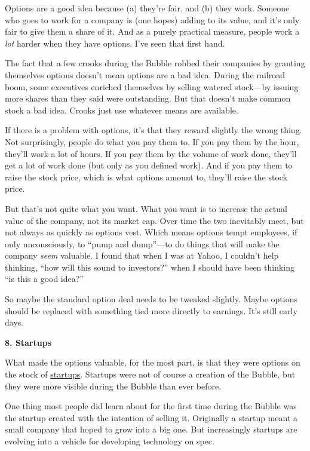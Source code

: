 Options are a good idea because (a) they're fair, and (b) they work.
Someone who goes to work for a company is (one hopes) adding to its
value, and it's only fair to give them a share of it. And as a purely
practical measure, people work a \emph{lot} harder when they have
options. I've seen that first hand.

The fact that a few crooks during the Bubble robbed their companies by
granting themselves options doesn't mean options are a bad idea. During
the railroad boom, some executives enriched themselves by selling
watered stock---by issuing more shares than they said were outstanding.
But that doesn't make common stock a bad idea. Crooks just use whatever
means are available.

If there is a problem with options, it's that they reward slightly the
wrong thing. Not surprisingly, people do what you pay them to. If you
pay them by the hour, they'll work a lot of hours. If you pay them by
the volume of work done, they'll get a lot of work done (but only as you
defined work). And if you pay them to raise the stock price, which is
what options amount to, they'll raise the stock price.

But that's not quite what you want. What you want is to increase the
actual value of the company, not its market cap. Over time the two
inevitably meet, but not always as quickly as options vest. Which means
options tempt employees, if only unconsciously, to ``pump and
dump''---to do things that will make the company \emph{seem} valuable. I
found that when I was at Yahoo, I couldn't help thinking, ``how will
this sound to investors?'' when I should have been thinking ``is this a
good idea?''

So maybe the standard option deal needs to be tweaked slightly. Maybe
options should be replaced with something tied more directly to
earnings. It's still early days.

\textbf{8. Startups}

What made the options valuable, for the most part, is that they were
options on the stock of \href{start.html}{startups}. Startups were not
of course a creation of the Bubble, but they were more visible during
the Bubble than ever before.

One thing most people did learn about for the first time during the
Bubble was the startup created with the intention of selling it.
Originally a startup meant a small company that hoped to grow into a big
one. But increasingly startups are evolving into a vehicle for
developing technology on spec.


